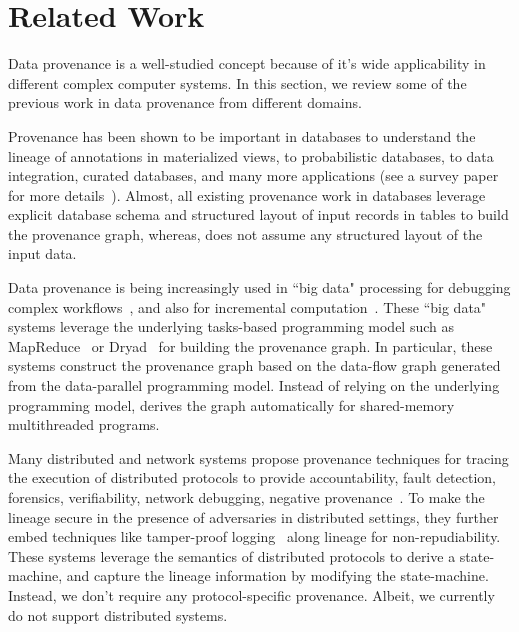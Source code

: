 \section{Related Work}
\label{sec:related}







Data provenance is a well-studied concept because of it's wide applicability in different complex computer systems. In this section, we review some of the previous work in data provenance from different domains.




 Provenance has been shown to be important in databases to understand the lineage of annotations in materialized views,  to probabilistic databases, to data integration, curated databases, and many more applications (see a survey paper for more details~\cite{provenance-database-tutorial}). Almost, all existing provenance work in databases leverage explicit database schema and structured layout of input records in tables to build the provenance graph, whereas, \projecttitle does not assume any structured layout of the input data.

 
 Data provenance is being increasingly used in ``big data"  processing for  debugging complex workflows~\cite{nova}, and also for incremental computation~\cite{incoop}.  These ``big data" systems leverage the underlying tasks-based programming model such as MapReduce~\cite{mapreduce} or Dryad~\cite{dryad} for building the provenance graph. 
In particular, these systems construct the provenance graph based on the data-flow graph generated from the data-parallel programming model. 
Instead of relying on the underlying programming model,  \projecttitle derives the graph automatically for shared-memory multithreaded programs.


 Many distributed and network systems propose provenance techniques for tracing the  execution of distributed protocols to provide accountability, fault detection, forensics, verifiability, network debugging, negative provenance~\cite{snp, exspan, wu-2014-negative-provenance, dtap}. To make the lineage secure in the presence of adversaries in distributed settings, they further embed techniques like tamper-proof logging~\cite{peer-review} along lineage for non-repudiability.  
These systems leverage the semantics of distributed protocols to derive a state-machine, and capture the lineage information by modifying the state-machine. Instead, we don't require any protocol-specific provenance. Albeit, we currently do not support distributed systems.

